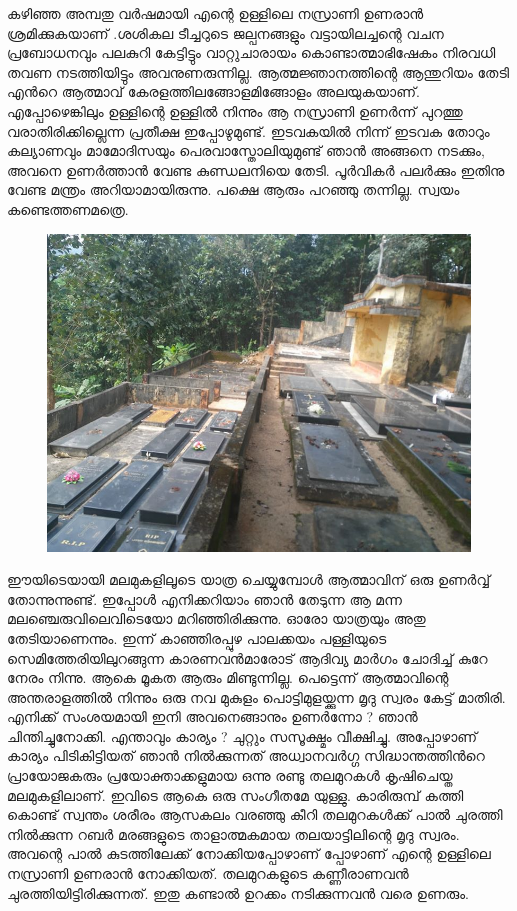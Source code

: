 \documentclass[10pt,a4paper]{report}
\begin{document}
 കഴിഞ്ഞ അമ്പതു വർഷമായി എന്റെ ഉള്ളിലെ നസ്രാണി ഉണരാൻ ശ്രമിക്കുകയാണ് .ശശികല ടീച്ചറുടെ ജല്പനങ്ങളും വട്ടായിലച്ചന്റെ വചന പ്രബോധനവും പലകുറി കേട്ടിട്ടും വാറ്റുചാരായം കൊണ്ടാത്മാഭിഷേകം നിരവധി തവണ നടത്തിയിട്ടും അവനുണരുന്നില്ല. ആത്മജ്ഞാനത്തിന്റെ ആന്തുറിയം തേടി എൻറെ ആത്മാവ് കേരളത്തിലങ്ങോളമിങ്ങോളം അലയുകയാണ്. എപ്പോഴെങ്കിലും ഉള്ളിന്റെ ഉള്ളിൽ നിന്നും ആ നസ്രാണി ഉണർന്ന് പുറത്തു വരാതിരിക്കില്ലെന്ന പ്രതീക്ഷ ഇപ്പോഴുമുണ്ട്. ഇടവകയിൽ നിന്ന് ഇടവക തോറും കല്യാണവും മാമോദിസയും പെരവാസ്തോലിയുമുണ്ട് ഞാൻ അങ്ങനെ നടക്കും, അവനെ ഉണർത്താൻ വേണ്ട കുണ്ഡലനിയെ തേടി. പൂർവികർ പലർക്കും ഇതിനു വേണ്ട മന്ത്രം അറിയാമായിരുന്നു. പക്ഷെ ആരും പറഞ്ഞു തന്നില്ല. സ്വയം കണ്ടെത്തണമത്രെ.
   \begin{figure}[H]
  \center
\includegraphics[scale=.25]{images/nas1}
\label{nas1}
\caption{   }
\end{figure}
  ഈയിടെയായി മലമുകളിലൂടെ യാത്ര ചെയ്യുമ്പോൾ ആത്മാവിന് ഒരു ഉണർവ്വ് തോന്നുന്നുണ്ട്. ഇപ്പോൾ എനിക്കറിയാം ഞാൻ തേടുന്ന ആ മന്ന മലഞ്ചെരുവിലെവിടെയോ മറിഞ്ഞിരിക്കുന്നു. ഓരോ യാത്രയും അതു തേടിയാണെന്നും. ഇന്ന് കാഞ്ഞിരപ്പുഴ പാലക്കയം പള്ളിയുടെ സെമിത്തേരിയിലുറങ്ങുന്ന കാരണവൻമാരോട് ആദിവ്യ മാർഗം ചോദിച്ച് കുറേ നേരം നിന്നു. ആകെ മൂകത ആരും മിണ്ടുന്നില്ല. പെട്ടെന്ന് ആത്മാവിന്റെ അന്തരാളത്തിൽ നിന്നും ഒരു നവ മുകുളം പൊട്ടിമുളയ്ക്കുന്ന മൃദു സ്വരം കേട്ട് മാതിരി. എനിക്ക് സംശയമായി ഇനി അവനെങ്ങാനും ഉണർന്നോ ? ഞാൻ ചിന്തിച്ചുനോക്കി. എന്താവും കാര്യം ? ചുറ്റും സസൂക്ഷ്മം വീക്ഷിച്ചു. അപ്പോഴാണ് കാര്യം പിടികിട്ടിയത് ഞാൻ നിൽക്കുന്നത് അധ്വാനവർഗ്ഗ സിദ്ധാന്തത്തിൻറെ പ്രായോജകരും പ്രയോക്താക്കളുമായ ഒന്നു രണ്ടു തലമുറകൾ കൃഷിചെയ്ത മലമുകളിലാണ്. ഇവിടെ ആകെ ഒരു സംഗീതമേ യുള്ളു. കാരിരുമ്പ് കത്തി കൊണ്ട് സ്വന്തം ശരീരം ആസകലം വരഞ്ഞു കീറി തലമുറകൾക്ക് പാൽ ചുരത്തി നിൽക്കുന്ന റബർ മരങ്ങളുടെ താളാത്മകമായ തലയാട്ടിലിന്റെ മൃദു സ്വരം. അവന്റെ പാൽ കുടത്തിലേക്ക് നോക്കിയപ്പോഴാണ് പ്പോഴാണ് എന്റെ ഉള്ളിലെ നസ്രാണി ഉണരാൻ നോക്കിയത്. തലമുറകളുടെ കണ്ണീരാണവൻ ചുരത്തിയിട്ടിരിക്കുന്നത്. ഇതു കണ്ടാൽ ഉറക്കം നടിക്കുന്നവൻ വരെ ഉണരും.
\end{document}
